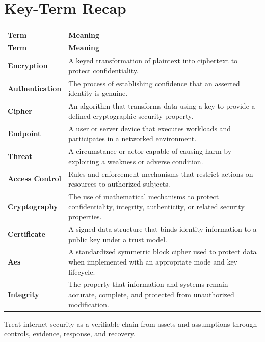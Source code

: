 \documentclass[11pt]{article}
\begin{document}
\section*{Key-Term Recap}
\begin{longtable}{>{\RaggedRight\arraybackslash}p{}>{\RaggedRight\arraybackslash}p{}}
\toprule\rowcolor{Navy}\color{white}\textbf{Term} & \color{white}\textbf{Meaning}\\\midrule
\endfirsthead
\toprule\rowcolor{Navy}\color{white}\textbf{Term} & \color{white}\textbf{Meaning}\\\midrule
\endhead
\textbf{Encryption} & A keyed transformation of plaintext into ciphertext to protect confidentiality. \\\midrule
\textbf{Authentication} & The process of establishing confidence that an asserted identity is genuine. \\\midrule
\textbf{Cipher} & An algorithm that transforms data using a key to provide a defined cryptographic security property. \\\midrule
\textbf{Endpoint} & A user or server device that executes workloads and participates in a networked environment. \\\midrule
\textbf{Threat} & A circumstance or actor capable of causing harm by exploiting a weakness or adverse condition. \\\midrule
\textbf{Access Control} & Rules and enforcement mechanisms that restrict actions on resources to authorized subjects. \\\midrule
\textbf{Cryptography} & The use of mathematical mechanisms to protect confidentiality, integrity, authenticity, or related security properties. \\\midrule
\textbf{Certificate} & A signed data structure that binds identity information to a public key under a trust model. \\\midrule
\textbf{Aes} & A standardized symmetric block cipher used to protect data when implemented with an appropriate mode and key lifecycle. \\\midrule
\textbf{Integrity} & The property that information and systems remain accurate, complete, and protected from unauthorized modification. \\\midrule
\bottomrule
\end{longtable}
\begin{takeawaybox}
Treat internet security as a verifiable chain from assets and assumptions through controls, evidence, response, and recovery.
\end{takeawaybox}
\end{document}
